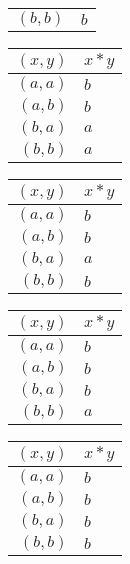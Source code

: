 \begin{enumerate}[label={\Alph*.},font={\bfseries}]
\begin{enumerate}[label={\arabic*},font={\bfseries}]
\begin{minipage}[h]{.25\textwidth}
\begin{tabular}{ r | l }
            $(b,b)$ & $b$
          \end{tabular}
        \end{minipage}
        \begin{minipage}[h]{.25\textwidth}
          \begin{tabular}{ r | l }
            $(x,y)$ & $x*y$ \\
            \hline
            $(a,a)$ & $b$ \\
            $(a,b)$ & $b$ \\
            $(b,a)$ & $a$ \\
            $(b,b)$ & $a$
          \end{tabular}
        \end{minipage}
        \begin{minipage}[h]{.25\textwidth}
          \begin{tabular}{ r | l }
            $(x,y)$ & $x*y$ \\
            \hline
            $(a,a)$ & $b$ \\
            $(a,b)$ & $b$ \\
            $(b,a)$ & $a$ \\
            $(b,b)$ & $b$
          \end{tabular}
        \end{minipage}
        \begin{minipage}[h]{.25\textwidth}
          \begin{tabular}{ r | l }
            $(x,y)$ & $x*y$ \\
            \hline
            $(a,a)$ & $b$ \\
            $(a,b)$ & $b$ \\
            $(b,a)$ & $b$ \\
            $(b,b)$ & $a$
          \end{tabular}
        \end{minipage}
        \begin{minipage}[h]{.25\textwidth}
          \begin{tabular}{ r | l }
            $(x,y)$ & $x*y$ \\
            \hline
            $(a,a)$ & $b$ \\
            $(a,b)$ & $b$ \\
            $(b,a)$ & $b$ \\
            $(b,b)$ & $b$

\end{tabular}
\end{minipage}
\end{enumerate}
\end{enumerate}
